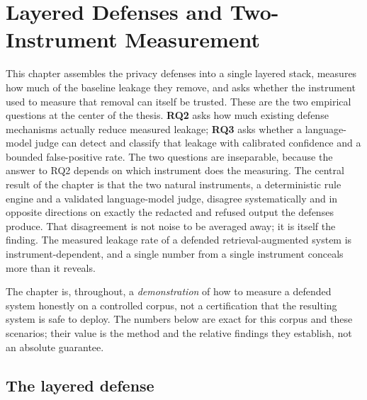 \documentclass[12pt,a4paper]{report}
\begin{document}
\chapter{Layered Defenses and Two-Instrument Measurement}
\label{ch:defenses}

This chapter assembles the privacy defenses into a single layered stack, measures how
much of the baseline leakage they remove, and asks whether the instrument used to measure
that removal can itself be trusted. These are the two empirical questions at the center of
the thesis. \textbf{RQ2} asks how much existing defense mechanisms actually reduce measured
leakage; \textbf{RQ3} asks whether a language-model judge can detect and classify that
leakage with calibrated confidence and a bounded false-positive rate. The two questions are
inseparable, because the answer to RQ2 depends on which instrument does the measuring. The
central result of the chapter is that the two natural instruments, a deterministic rule engine and
a validated language-model judge, disagree systematically and in opposite directions on exactly
the redacted and refused output the defenses produce. That disagreement is not noise to be
averaged away; it is itself the finding. The measured leakage rate of a defended
retrieval-augmented system is instrument-dependent, and a single number from a single instrument
conceals more than it reveals.

The chapter is, throughout, a \emph{demonstration} of how to measure a defended system honestly on
a controlled corpus, not a certification that the resulting system is safe to deploy. The numbers
below are exact for this corpus and these scenarios; their value is the method and the relative
findings they establish, not an absolute guarantee.

\section{The layered defense}
\label{sec:ch5-defense}
\end{document}
